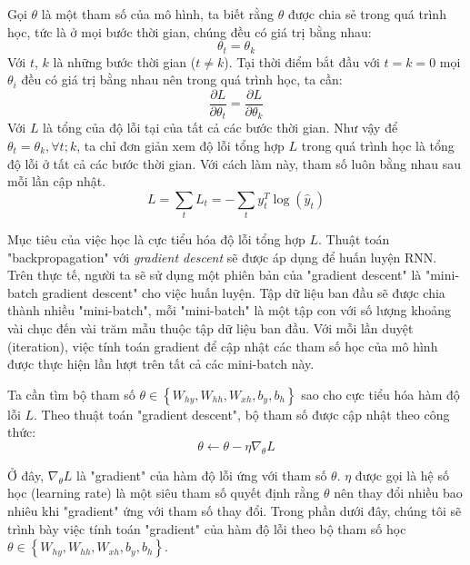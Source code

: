 Gọi $\theta$ là một tham số của mô hình, ta biết rằng $\theta$ được chia sẻ trong quá trình học, tức là ở mọi bước thời gian, chúng đều có giá trị bằng nhau:
\begin{equation} \label{weightSharing1}
	\theta_t = \theta_k
\end{equation}
Với $t$, $k$ là những bước thời gian ($t \ne k$). Tại thời điểm bắt đầu với $t=k=0$ mọi $\theta_i$ đều có giá trị bằng nhau nên trong quá trình học, ta cần:
\begin{equation} \label{weightSharing2}
	\frac{\partial L}{\partial \theta_t} = \frac{\partial L}{\partial \theta_k}
\end{equation}
Với $L$ là tổng của độ lỗi tại của tất cả các bước thời gian. Như vậy để $\theta_t = \theta_k, \forall t;k$, ta chỉ đơn giản xem độ lỗi tổng hợp $L$ trong quá trình học là tổng độ lỗi ở tất cả các bước thời gian. Với cách làm này, tham số luôn bằng nhau sau mỗi lần cập nhật.
\begin{equation} \label{errorOfAll}
	L = \sum_{t}L_t = - \sum_{t} y_t^{T} \log(\hat{y}_t) 
\end{equation}

Mục tiêu của việc học là cực tiểu hóa độ lỗi tổng hợp $L$. Thuật toán "backpropagation" với \textit{gradient descent} sẽ được áp dụng để huấn luyện RNN. Trên thực tế, người ta sẽ sử dụng một phiên bản của "gradient descent" là "mini-batch gradient descent" cho việc huấn luyện. Tập dữ liệu ban đầu sẽ được chia thành nhiều "mini-batch", mỗi "mini-batch" là một tập con với số lượng khoảng vài chục đến vài trăm mẫu thuộc tập dữ liệu ban đầu. Với mỗi lần duyệt (iteration), việc tính toán gradient để cập nhật các tham số học của mô hình được thực hiện lần lượt trên tất cả các mini-batch này.

Ta cần tìm bộ tham số $\theta \in \left\{W_{hy},W_{hh},W_{xh},b_y,b_h \right \}$ sao cho cực tiểu hóa hàm độ lỗi $L$. Theo thuật toán "gradient descent", bộ tham số được cập nhật theo công thức:
\begin{equation} \label{gradientDescentWithTheta}
	\theta \leftarrow \theta - \eta \nabla_{\theta} L
\end{equation}

Ở đây, $\nabla_{\theta} L$ là "gradient" của hàm độ lỗi ứng với tham số $\theta$. $\eta$ được gọi là hệ số học (learning rate) là một siêu tham số quyết định rằng $\theta$ nên thay đổi nhiều bao nhiêu khi "gradient" ứng với tham số thay đổi. Trong phần dưới đây, chúng tôi sẽ trình bày việc tính toán "gradient" của hàm độ lỗi theo bộ tham số học $\theta \in \left\{W_{hy},W_{hh},W_{xh},b_y,b_h \right \}$.

